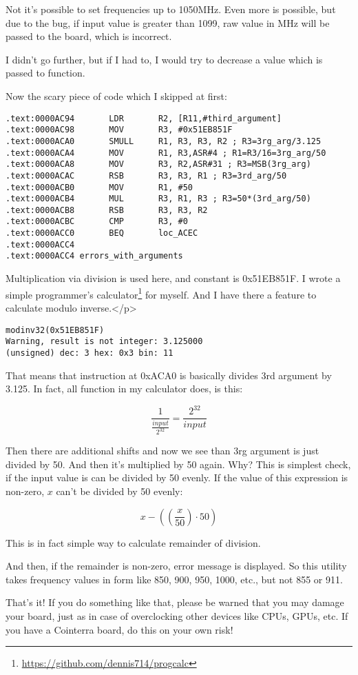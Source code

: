 Not it's possible to set frequencies up to 1050MHz. Even more is possible, but due to the bug, if input value is greater than 1099, raw value in MHz will be passed to the board, which is incorrect.

I didn't go further, but if I had to, I would try to decrease a value which is passed to  function.

Now the scary piece of code which I skipped at first:

\begin{lstlisting}[style=customasmARM]
.text:0000AC94       LDR       R2, [R11,#third_argument]
.text:0000AC98       MOV       R3, #0x51EB851F
.text:0000ACA0       SMULL     R1, R3, R3, R2 ; R3=3rg_arg/3.125
.text:0000ACA4       MOV       R1, R3,ASR#4 ; R1=R3/16=3rg_arg/50
.text:0000ACA8       MOV       R3, R2,ASR#31 ; R3=MSB(3rg_arg)
.text:0000ACAC       RSB       R3, R3, R1 ; R3=3rd_arg/50
.text:0000ACB0       MOV       R1, #50
.text:0000ACB4       MUL       R3, R1, R3 ; R3=50*(3rd_arg/50)
.text:0000ACB8       RSB       R3, R3, R2
.text:0000ACBC       CMP       R3, #0
.text:0000ACC0       BEQ       loc_ACEC
.text:0000ACC4
.text:0000ACC4 errors_with_arguments
\end{lstlisting}

Multiplication via division is used here, and constant is 0x51EB851F.
I wrote a simple programmer's calculator\footnote{\url{https://github.com/dennis714/progcalc}} for myself.
And I have there a feature to calculate modulo inverse.</p>

\begin{lstlisting}
modinv32(0x51EB851F)
Warning, result is not integer: 3.125000
(unsigned) dec: 3 hex: 0x3 bin: 11
\end{lstlisting}

That means that  instruction at 0xACA0 is basically divides 3rd argument by 3.125.
In fact, all  function in my calculator does, is this:

\[
\frac{1}{\frac{input}{2^{32}}} = \frac{2^{32}}{input}
\]

Then there are additional shifts and now we see than 3rg argument is just divided by 50.
And then it's multiplied by 50 again.
Why?
This is simplest check, if the input value is can be divided by 50 evenly.
If the value of this expression is non-zero, $x$ can't be divided by 50 evenly:

\[
x-((\frac{x}{50}) \cdot 50)
\]

This is in fact simple way to calculate remainder of division.

And then, if the remainder is non-zero, error message is displayed. So this utility takes frequency values in form like 850, 900, 950, 1000, etc., but not 855 or 911.

That's it! If you do something like that, please be warned that you may damage your board, just as in case of overclocking other devices like CPUs, GPUs, etc.
If you have a Cointerra board, do this on your own risk!

